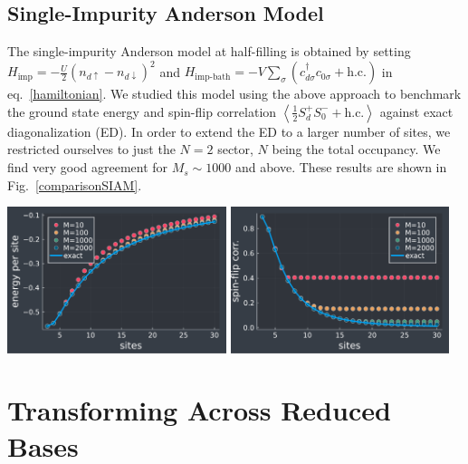 \documentclass[reprint]{revtex4-2}
\begin{document}
\subsection{Single-Impurity Anderson Model}
The single-impurity Anderson model at half-filling is obtained by setting \(H_\text{imp}=-\frac{U}{2}\left(n_{d \uparrow} - n_{d \downarrow}\right)^2 \) and \(H_\text{imp-bath} = -V\sum_\sigma \left(c^\dagger_{d\sigma}c_{0\sigma} + \text{h.c.}\right)\) in eq.~\ref{hamiltonian}. We studied this model using the above approach to benchmark the ground state energy and spin-flip correlation \(\left<\frac{1}{2}S_d^+ S_0^- + \text{h.c.} \right>\) against exact diagonalization (ED). In order to extend the ED to a larger number of sites, we restricted ourselves to just the \(N=2\) sector, \(N\) being the total occupancy. We find very good agreement for \(M_s \sim 1000\) and above. These results are shown in Fig.~\ref{comparisonSIAM}.
\begin{widetext}
\includegraphics[width=0.48\textwidth]{energy.pdf}
\includegraphics[width=0.48\textwidth]{spinflipcomparison.pdf}
\label{comparisonSIAM}
\end{widetext}

\section{Transforming Across Reduced Bases}
\end{document}
